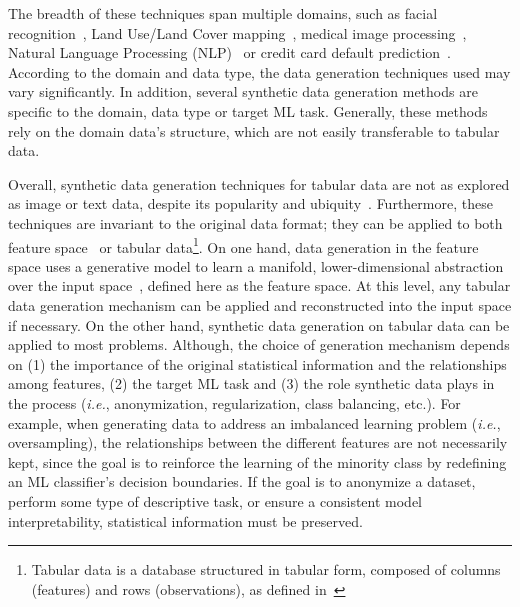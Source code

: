 \documentclass[parskip=full]{scrartcl}
\begin{document}
%
%
%
%

The breadth of these techniques span multiple domains, such as facial
recognition~\cite{lv2017data}, Land Use/Land Cover
mapping~\cite{douzas2019imbalanced}, medical image
processing~\cite{yi2019generative}, Natural Language Processing
(NLP)~\cite{feng2021survey} or credit card default
prediction~\cite{alam2020investigation}. According to the domain and data
type, the data generation techniques used may vary significantly. In addition,
several synthetic data generation methods are specific to the domain, data
type or target ML task. Generally, these methods rely on the domain data's
structure, which are not easily transferable to tabular data.

Overall, synthetic data generation techniques for tabular data are not as
explored as image or text data, despite its popularity and
ubiquity~\cite{fakoor2020fast}. Furthermore, these techniques are invariant to
the original data format; they can be applied to both feature
space~\cite{devries2017dataset} or tabular data\footnote{Tabular data is a
database structured in tabular form, composed of columns (features) and rows
(observations), as defined in~\cite{yoon2020vime}}. On one hand, data
generation in the feature space uses a generative model to learn a manifold,
lower-dimensional abstraction over the input
space~\cite{kingma2019introduction}, defined here as the feature space. At
this level, any tabular data generation mechanism can be applied and
reconstructed into the input space if necessary. On the other hand, synthetic
data generation on tabular data can be applied to most problems. Although, the
choice of generation mechanism depends on (1) the importance of the original
statistical information and the relationships among features, (2) the target
ML task and (3) the role synthetic data plays in the process (\textit{i.e.},
anonymization, regularization, class balancing, etc.).  For example, when
generating data to address an imbalanced learning problem (\textit{i.e.},
oversampling), the relationships between the different features are not
necessarily kept, since the goal is to reinforce the learning of the minority
class by redefining an ML classifier's decision boundaries. If the goal is to
anonymize a dataset, perform some type of descriptive task, or ensure a
consistent model interpretability, statistical information must be preserved.
\end{document}
